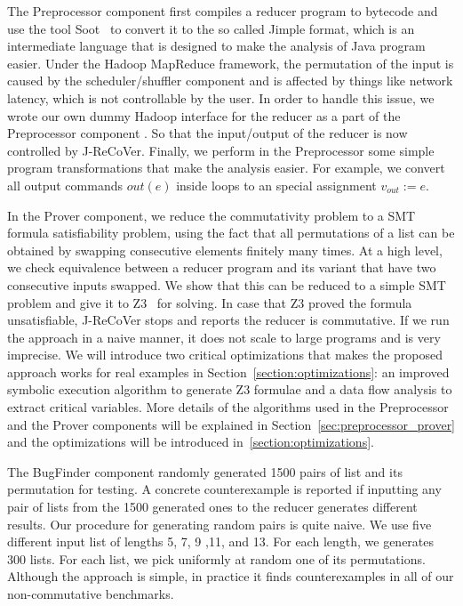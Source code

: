 \documentclass{llncs}
\begin{document}
The Preprocessor component first compiles a reducer program to bytecode and use the tool Soot~\cite{soot} to convert it to the so called Jimple format, which is an intermediate language that is designed to make the analysis of Java program easier. Under the Hadoop MapReduce framework, the permutation of the input is caused by the scheduler/shuffler component and is affected by things like network latency, which is not controllable by the user. In order to handle this issue, we wrote our own dummy Hadoop interface for the reducer as a part of the Preprocessor component . So that the input/output of the reducer is now controlled by J-ReCoVer. Finally, we perform in the Preprocessor some simple program transformations that make the analysis easier. For example, we convert all output commands $out(e)$ inside loops to an special assignment $v_{out}:=e$.

In the Prover component, we reduce the commutativity problem to a SMT formula satisfiability problem, using the fact that all permutations of a list can be obtained by swapping consecutive elements finitely many times. At a high level, we check equivalence between a reducer program and its variant that have two consecutive inputs swapped. We show that this can be reduced to a simple SMT problem and give it to Z3~\cite{z3} for solving. In case that Z3 proved the formula unsatisfiable, J-ReCoVer stops and reports the reducer is commutative. 
If we run the approach in a naive manner, it does not scale to large programs and is very imprecise.  We will introduce two critical optimizations that makes the proposed approach works for real examples in Section~\ref{section:optimizations}: an improved symbolic execution algorithm to generate Z3 formulae and a data flow analysis to extract critical variables. More details of the algorithms used in the Preprocessor and the Prover components will be explained in Section~\ref{sec:preprocessor_prover} and the optimizations will be introduced in~\ref{section:optimizations}. 

The BugFinder component randomly generated 1500 pairs of list and its permutation for testing. A concrete counterexample is reported if inputting any pair of lists from the 1500 generated ones to the reducer generates different results.
Our procedure for generating random pairs is quite naive. We use five different input list of lengths 5, 7, 9 ,11, and 13. For each length, we generates 300 lists. For each list, we pick uniformly at random one of its permutations. Although the approach is simple, in practice it finds counterexamples in all of our non-commutative benchmarks.
\end{document}
